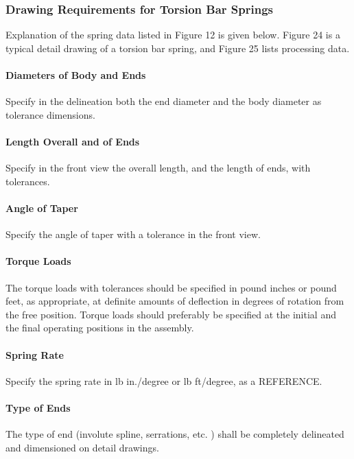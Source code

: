 \documentclass[10pt]{article}
\begin{document}
\subsubsection{Drawing Requirements for Torsion Bar Springs} %
Explanation of the spring data listed in Figure 12 is given below. 
Figure 24 is a typical detail drawing of a torsion bar spring, and Figure 25 lists processing data.

\paragraph{Diameters of Body and Ends} %
Specify in the delineation both the end diameter and the body diameter as tolerance dimensions.

\paragraph{Length Overall and of Ends} %
Specify in the front view the overall length, and the length of ends, with tolerances.

\paragraph{Angle of Taper} %
Specify the angle of taper with a tolerance in the front view.

\paragraph{Torque Loads} %
The torque loads with tolerances should be specified in pound inches or pound feet, as appropriate, at definite
amounts of deflection in degrees of rotation from the free position. 
Torque loads should preferably be specified at the initial and the final operating positions in the assembly.

\paragraph{Spring Rate} %
Specify the spring rate in lb in./degree or lb ft/degree, as a REFERENCE.

\paragraph{Type of Ends} %
The type of end (involute spline, serrations, etc. ) shall be completely delineated and dimensioned on detail drawings.
\end{document}
